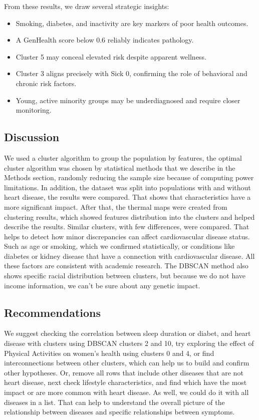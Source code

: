 \documentclass[12pt, a4paper]{article}
\begin{document}
From these results, we draw several strategic insights:
\begin{itemize}
  \item Smoking, diabetes, and inactivity are key markers of poor health outcomes.
  \item A GenHealth score below 0.6 reliably indicates pathology.
  \item Cluster 5 may conceal elevated risk despite apparent wellness.
  \item Cluster 3 aligns precisely with Sick 0, confirming the role of behavioral and chronic risk factors.
  \item Young, active minority groups may be underdiagnosed and require closer monitoring.
\end{itemize}

\subsection*{Discussion}
\hspace*{1em}
We used a cluster algorithm to group the population by features, the optimal cluster algorithm was chosen by statistical methods that we describe in the Methods section, randomly reducing the sample size because of computing power limitations. In addition, the dataset was split into populations with and without heart disease, the results were compared. That shows that characteristics have a more significant impact. After that, the thermal maps were created from clustering results, which showed features distribution into the clusters and helped describe the results. Similar clusters, with few differences, were compared. That helps to detect how minor discrepancies can affect cardiovascular disease status. Such as age or smoking\citep{Khan2025}, which we confirmed statistically, or conditions like diabetes or kidney disease that have a connection with cardiovascular disease. All these factors are consistent with academic research\citep{CardioCkidney}. The DBSCAN method also shows specific racial distribution between clusters, but because we do not have income information, we can't be sure about any genetic impact. 

\subsection*{Recommendations}
\hspace*{1em}
We suggest checking the correlation between sleep duration or diabet, and heart disease with clusters using DBSCAN clusters 2 and 10, try exploring the effect of Physical Activities on women's health using clusters 0 and 4, or find interconnections between other clusters, which can help us to build and confirm other hypotheses. Or, remove all rows that include other diseases that are not heart disease,  next check lifestyle characteristics, and find which have the most impact or are more common with heart disease. As well, we could do it with all diseases in a list. That can help to understand the overall picture of the relationship between diseases and specific relationships between symptoms.
\end{document}
